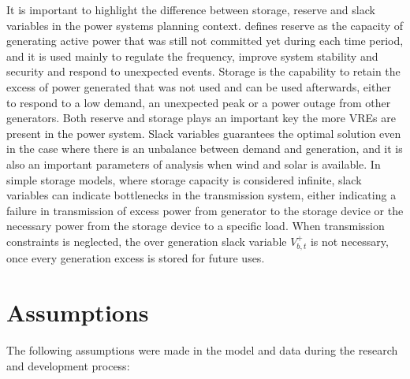 \documentclass[12pt,LUDisStyle,twosided]{book}
\begin{document}
It is important to highlight the difference between storage, reserve and slack variables in the power systems planning context.  \citeauthor{rebours} \cite{rebours} defines reserve as the capacity of generating active power that was still not committed yet during each time period, and it is used mainly to regulate the frequency, improve system stability and security and respond to unexpected events. Storage is the capability to retain the excess of power generated that was not used and can be used afterwards, either to respond to a low demand, an unexpected peak or a power outage from other generators. Both reserve and storage plays an important key the more VREs are present in the power system. Slack variables guarantees the optimal solution even in the case where there is an unbalance between demand and generation, and it is also an important parameters of analysis when wind and solar is available. In simple storage models, where storage capacity is considered infinite, slack variables can indicate bottlenecks in the transmission system, either indicating a failure in transmission of excess power from generator to the storage device or the necessary power from the storage device to a specific load. When transmission constraints is neglected, the over generation slack variable $V^{+}_{b,t}$ is not necessary, once every generation excess is stored for future uses.



\section{Assumptions}

The following assumptions were made in the model and data during the research and development process:
\end{document}
